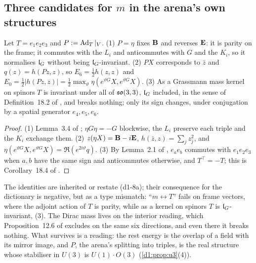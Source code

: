 \subsection{\texorpdfstring{Three candidates for $m$ in the arena's own structures}{Three candidates for m in the arena's own structures}}
\label{d1:sec:m}

\begin{proposition}
\label{d1:prop:Tparity}
Let $T=e_1e_2e_3$ and $P:=\operatorname{Ad}_T|_V$. (1) $P=\eta$ fixes $\mathbf B$ and reverses $\mathbf E$: it is parity on the frame; it commutes with the $L_i$ and
anticommutes with $G$ and the $K_i$, so it normalises $\mathfrak l_G$ without being $\mathfrak l_G$-invariant. (2) $PX$ corresponds to $\bar z$ and $q(z)=h(Pz,z)$, so
$E_6=\tfrac12h(z,z)$ and $E_0=\tfrac12|h(Pz,z)|=\tfrac12\max_\vartheta\eta(e^{\vartheta G}X,e^{\vartheta G}X)$. (3) As a Grassmann mass kernel on spinors $T$ is
invariant under all of $\mathfrak{so}(3,3)$, $\mathfrak l_G$ included, in the sense of Definition~18.2 of \cite{ES17}, and breaks nothing; only its sign changes, under
conjugation by a spatial generator $e_4,e_5,e_6$.
\end{proposition}

\begin{proof}
(1) Lemma~3.4 of \cite{ES17}; $\eta G\eta=-G$ blockwise, the $L_i$ preserve each triple and the $K_i$ exchange them. (2) $z(\eta X)=\mathbf B-i\mathbf E$,
$h(\bar z,z)=\sum_jz_j^2$, and $\eta(e^{\vartheta G}X,e^{\vartheta G}X)=\Re(e^{2i\vartheta}q)$. (3) By Lemma~2.1 of \cite{ES17}, $e_ae_b$ commutes with
$e_1e_2e_3$ when $a,b$ have the same sign and anticommutes otherwise, and $T^{\!\top}=-T$; this is Corollary~18.4 of \cite{ES17}.
\end{proof}

The identities are inherited or restate \cite{ES17} (d1-8a); their consequence for the dictionary is negative, but as a type mismatch:
``$m\leftrightarrow T$'' fails on frame vectors, where the adjoint action of $T$ is parity, while as a kernel on spinors $T$ is $\mathfrak l_G$-invariant, (3).
The Dirac mass lives on the interior reading, which Proposition~12.6 of \cite{ES17} excludes on the same six directions, and even there it breaks
nothing. What survives is a reading: the rest energy is the overlap of a field with its mirror image, and $P$, the arena's splitting into triples, is
the real structure whose stabiliser in $U(3)$ is $U(1)\cdot O(3)$ (\cref{d1:prop:u3}(4)).

